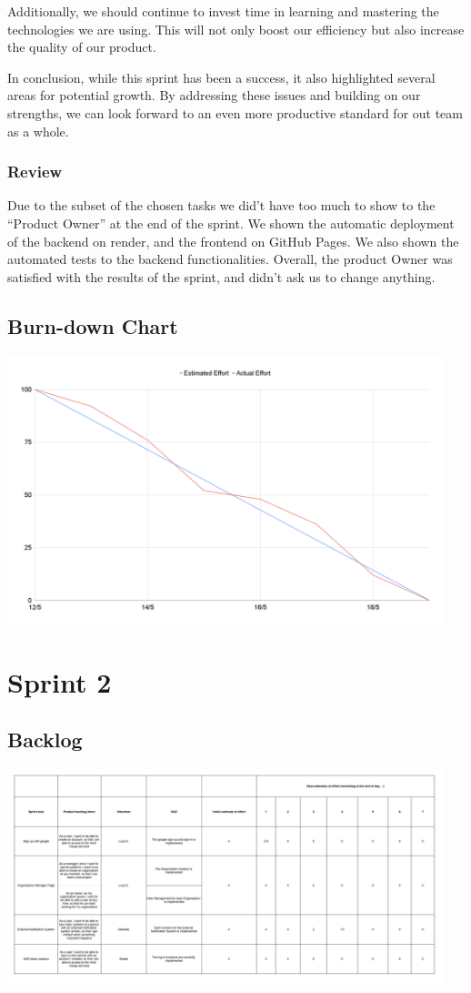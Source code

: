 \documentclass{article}
\begin{document}
Additionally, we should continue to invest time in learning and mastering the technologies we are using. This will not only boost our efficiency but also increase the quality of our product.

In conclusion, while this sprint has been a success, it also highlighted several areas for potential growth. By addressing these issues and building on our strengths, we can look forward to an even more productive standard for out team as a whole.

\subsubsection{Review}

Due to the subset of the chosen tasks we did't have too much to show to the ``Product Owner'' at the end of the sprint.
We shown the automatic deployment of the backend on render, and the frontend on GitHub Pages. We also shown the
automated tests to the backend functionalities.
Overall, the product Owner was satisfied with the results of the sprint, and didn't ask us to change anything.

\subsection{Burn-down Chart}
\includegraphics[width=0.95\textwidth]{images/burndown_chart.png}

\section{Sprint 2}

\subsection{Backlog}
\includegraphics[width=0.95\textwidth]{images/sprint_backlog_2.jpg}
\end{document}

